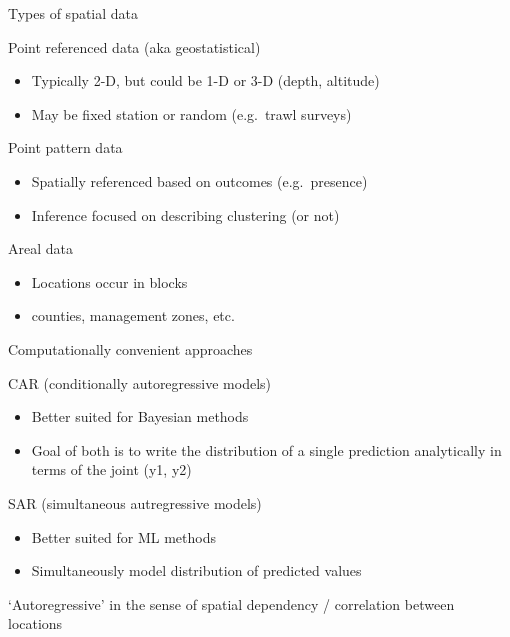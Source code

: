 \documentclass[ignorenonframetext,]{beamer}
\providecommand{\tightlist}{%
  \setlength{\itemsep}{0pt}\setlength{\parskip}{0pt}}
\begin{document}
\begin{frame}{Types of spatial data}
\protect\hypertarget{types-of-spatial-data}{}

Point referenced data (aka geostatistical)

\begin{itemize}
\tightlist
\item
  Typically 2-D, but could be 1-D or 3-D (depth, altitude)
\item
  May be fixed station or random (e.g.~trawl surveys)
\end{itemize}

Point pattern data

\begin{itemize}
\tightlist
\item
  Spatially referenced based on outcomes (e.g.~presence)
\item
  Inference focused on describing clustering (or not)
\end{itemize}

Areal data

\begin{itemize}
\tightlist
\item
  Locations occur in blocks
\item
  counties, management zones, etc.
\end{itemize}

\end{frame}

\begin{frame}{Computationally convenient approaches}
\protect\hypertarget{computationally-convenient-approaches}{}

CAR (conditionally autoregressive models)

\begin{itemize}
\tightlist
\item
  Better suited for Bayesian methods
\item
  Goal of both is to write the distribution of a single prediction
  analytically in terms of the joint (y1, y2)
\end{itemize}

SAR (simultaneous autregressive models)

\begin{itemize}
\tightlist
\item
  Better suited for ML methods
\item
  Simultaneously model distribution of predicted values
\end{itemize}

`Autoregressive' in the sense of spatial dependency / correlation
between locations

\end{frame}
\end{document}
